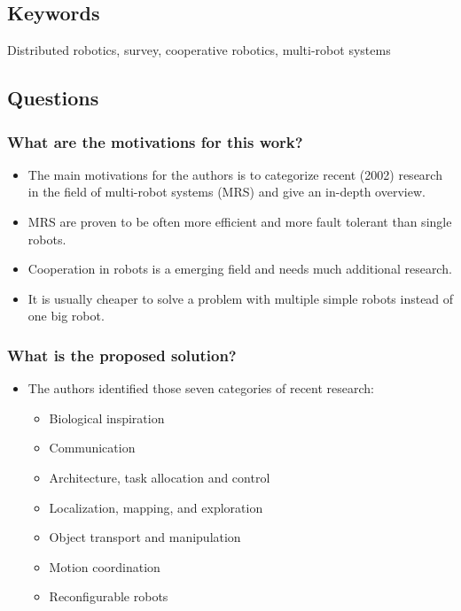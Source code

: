 \subsection*{Keywords}
Distributed robotics, survey, cooperative robotics, multi-robot systems



\subsection*{Questions}
\subsubsection*{What are the motivations for this work?}
\begin{itemize}
    \item The main motivations for the authors is to categorize recent (2002) research in the field of multi-robot systems (MRS) and give an in-depth overview.
    \item MRS are proven to be often more efficient and more fault tolerant than single robots. 
    \item Cooperation in robots is a emerging field and needs much additional research.
    \item It is usually cheaper to solve a problem with multiple simple robots instead of one big robot.
\end{itemize}
\subsubsection*{What is the proposed solution?}
\begin{itemize}
    \item The authors identified those seven categories of recent research: \ 
    \begin{itemize}
        \item Biological inspiration
        \item Communication
        \item Architecture, task allocation and control
        \item Localization, mapping, and exploration
        \item Object transport and manipulation
        \item Motion coordination 
        \item Reconfigurable robots
    \end{itemize}
\end{itemize}
